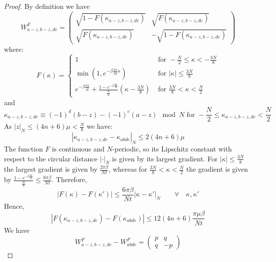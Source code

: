 \begin{proof}
    By definition we have
\begin{equation}
     W^F_{a-z,b-z,de} = \begin{pmatrix}
        \sqrt{1 - F(\kappa_{a-z,b-z,de})} & \sqrt{F(\kappa_{a-z,b-z,de})}\\
       \sqrt{F(\kappa_{a-z,b-z,de})} & -\sqrt{1 - F(\kappa_{a-z,b-z,de})}
    \end{pmatrix}
\end{equation}
where:
\begin{equation}
    F(\kappa) = \begin{cases}1& \text{ for }  -\frac{N}{2} \leq \kappa <  -\frac{3N}{8}\\
        \min(1,e^{-\beta \frac{2\pi}{Nt} \kappa}) & \text{ for } |\kappa|\leq \frac{3N}{8}\\
        e^{-\beta\frac{3\pi}{4t}} + \frac{1- e^{-\beta\frac{3\pi}{4t}}}{\frac{N}{8}}(\kappa - \frac{3N}{8}) & \text{ for }  \frac{3N}{8} < \kappa <  \frac{N}{2}
    \end{cases}
\end{equation}
and
\begin{equation}
    \kappa_{a-z,b-z,de} \equiv (-1)^d(b-z) - (-1)^e(a-z) \mod N \text{ for } -\frac{N}{2} \leq \kappa_{a-z,b-z,de} < \frac{N}{2}
\end{equation}
As $|z|_{N} \leq (4n+6)\mu< \frac{N}{8}$  we have:
\begin{equation}
    |\kappa_{a-z,b-z,de} - \kappa_{abde}|_{N} \leq 2(4n+6)\mu
\end{equation}
The function $F$ is continuous and $N$-periodic, so its Lipschitz constant with respect to the circular distance $|\cdot|_{N}$ is given by its largest gradient. For $|\kappa|\leq \frac{3N}{8}$ the largest gradient is given by $\frac{2\pi\beta}{Nt}$, whereas for $ \frac{3N}{8} < \kappa <  \frac{N}{2}$ the gradient is given by $\frac{1- e^{-\beta\frac{3\pi}{4t}}}{\frac{N}{8}} \leq \frac{6\pi\beta}{Nt}$. Therefore,
\begin{equation}
     |F(\kappa)-F(\kappa')|\leq \frac{6\pi\beta}{Nt}|\kappa - \kappa'|_{N} \qquad \forall \quad \kappa, \kappa'
\end{equation}
Hence,
\begin{equation}
    |F(\kappa_{a-z,b-z,de})-F(\kappa_{abde})|\leq 12(4n+6)\frac{\pi\mu\beta}{Nt}
\end{equation}
We have
\begin{equation}
    W^F_{a-z,b-z,de}-W^F_{abde}=\begin{pmatrix} p & q\\ q & -p\end{pmatrix}

\end{equation}
\end{proof}

